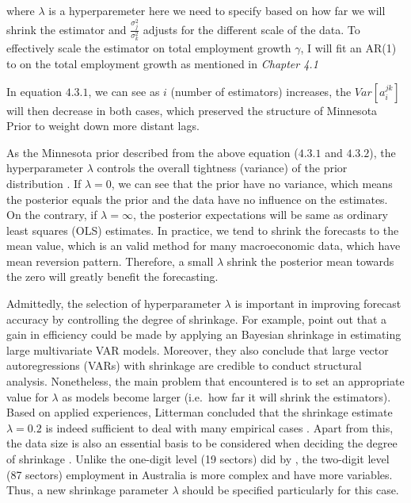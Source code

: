 \documentclass{monashthesis}
\begin{document}
where \(\lambda\) is a hyperparemeter here we need to specify based on how far we will shrink the estimator and \(\frac{\sigma^2_{j}}{\sigma^2_k}\) adjusts for the different scale of the data. To effectively scale the estimator on total employment growth \(\gamma\), I will fit an AR(1) to on the total employment growth as mentioned in \emph{Chapter 4.1}

In equation \(4.3.1\), we can see as \(i\) (number of estimators) increases, the \(Var[a_i^{jk}]\) will then decrease in both cases, which preserved the structure of Minnesota Prior to weight down more distant lags.

As the Minnesota prior described from the above equation (\(4.3.1\) and \(4.3.2\)), the hyperparameter \(\lambda\) controls the overall tightness (variance) of the prior distribution \autocite{banbura2010large}. If \(\lambda=0\), we can see that the prior have no variance, which means the posterior equals the prior and the data have no influence on the estimates. On the contrary, if \(\lambda=\infty\), the posterior expectations will be same as ordinary least squares (OLS) estimates. In practice, we tend to shrink the forecasts to the mean value, which is an valid method for many macroeconomic data, which have mean reversion pattern. Therefore, a small \(\lambda\) shrink the posterior mean towards the zero will greatly benefit the forecasting.

Admittedly, the selection of hyperparameter \(\lambda\) is important in improving forecast accuracy by controlling the degree of shrinkage. For example, \textcite{banbura2010large} point out that a gain in efficiency could be made by applying an Bayesian shrinkage in estimating large multivariate VAR models. Moreover, they also conclude that large vector autoregressions (VARs) with shrinkage are credible to conduct structural analysis. Nonetheless, the main problem that encountered is to set an appropriate value for \(\lambda\) as models become larger (i.e.~how far it will shrink the estimators). Based on applied experiences, Litterman concluded that the shrinkage estimate \(\lambda=0.2\) is indeed sufficient to deal with many empirical cases \autocite{litterman1986}. Apart from this, the data size is also an essential basis to be considered when deciding the degree of shrinkage \autocite{banbura2010large}. Unlike the one-digit level (19 sectors) did by \textcite{anderson2020}, the two-digit level (87 sectors) employment in Australia is more complex and have more variables. Thus, a new shrinkage parameter \(\lambda\) should be specified particularly for this case.
\end{document}
